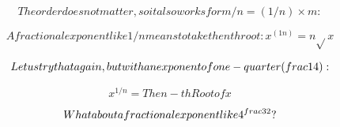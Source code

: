 \[The order does not matter, so it also works for m/n = (1/n) \times m:\]

\[A fractional exponent like 1/n means to take the nth root: x^{(1n)} = n\sqrt{}x\]

\[Let us try that again, but with an exponent of one-quarter (\\frac{1}{4}):\]

\[x^{1/n} = The n-th Root of x\]

\[What about a fractional exponent like 4^{\\frac{3}{2}} ?\]

